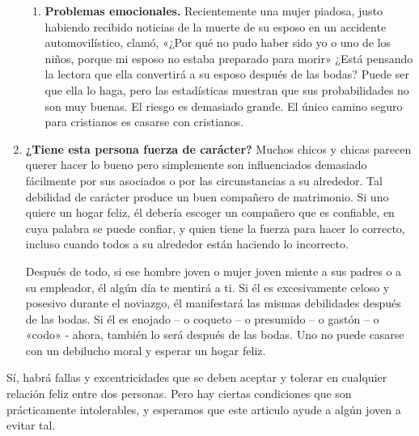 \documentclass[12pt, twoside, openright]{book}
\begin{document}
\begin{enumerate}
\begin{enumerate}
	\item \textbf{Problemas emocionales.} Recientemente una mujer piadosa, justo habiendo recibido noticias de la muerte de su esposo en un accidente automovilístico, clamó, «¿Por qué no pudo haber sido yo o uno de los niños, porque mi esposo no estaba preparado 					para morir»
			¿Está pensando la lectora que ella convertirá a su esposo después de las bodas? Puede ser que ella lo haga, pero las estadísticas muestran que sus probabilidades no son muy buenas. El riesgo es demasiado grande. El único camino seguro para cristianos 				es casarse con cristianos.
	\end{enumerate}
\item \textbf{¿Tiene esta persona fuerza de carácter?} Muchos chicos y chicas parecen querer hacer lo bueno pero simplemente son influenciados demasiado fácilmente por sus asociados o por las circunstancias a su alrededor. Tal debilidad de carácter produce un buen compañero de matrimonio. Si uno quiere un hogar feliz, él debería escoger un compañero que es confiable, en cuya palabra se puede confiar, y quien tiene la fuerza para hacer lo correcto, incluso cuando todos a su alrededor están haciendo lo incorrecto.

Después de todo, si ese hombre joven o mujer joven miente a sus padres o a su empleador, él algún día te mentirá a ti. Si él es excesivamente celoso y posesivo durante el noviazgo, él manifestará las mismas debilidades después de las bodas. Si él es enojado – o coqueto – o presumido – o gastón – o «codo» - ahora, también lo será después de las bodas. Uno no puede casarse con un debilucho moral y esperar un hogar feliz.
\end{enumerate}
Sí, habrá fallas y excentricidades que se deben aceptar y tolerar en cualquier relación feliz entre dos personas. Pero hay ciertas condiciones que son prácticamente intolerables, y esperamos que este articulo ayude a algún joven a evitar tal.
\end{document}
